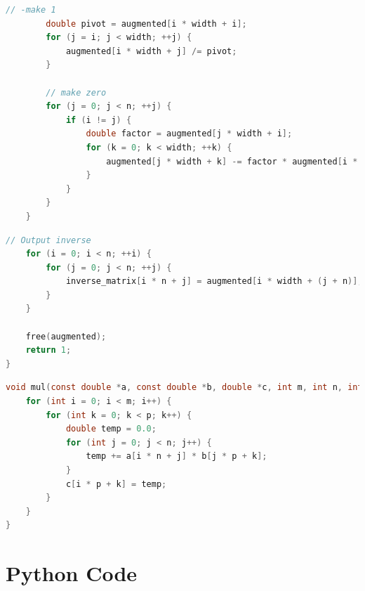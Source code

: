 \documentclass{beamer}
\theoremstyle{remark}
\numberwithin{equation}{section}
\begin{document}
\begin{frame}[fragile]
\begin{lstlisting}[language=C]
        // -make 1
        double pivot = augmented[i * width + i];
        for (j = i; j < width; ++j) {
            augmented[i * width + j] /= pivot;
        }

        // make zero
        for (j = 0; j < n; ++j) {
            if (i != j) {
                double factor = augmented[j * width + i];
                for (k = 0; k < width; ++k) {
                    augmented[j * width + k] -= factor * augmented[i * width + k];
                }
            }
        }
    }
\end{lstlisting}
\end{frame}
\begin{frame}[fragile]
\begin{lstlisting}[language=C]
    // Output inverse
    for (i = 0; i < n; ++i) {
        for (j = 0; j < n; ++j) {
            inverse_matrix[i * n + j] = augmented[i * width + (j + n)];
        }
    }

    free(augmented);
    return 1;
}
\end{lstlisting}
\end{frame}
\begin{frame}[fragile]
\begin{lstlisting}[language=C]
void mul(const double *a, const double *b, double *c, int m, int n, int p) {
    for (int i = 0; i < m; i++) {
        for (int k = 0; k < p; k++) {
            double temp = 0.0;
            for (int j = 0; j < n; j++) {
                temp += a[i * n + j] * b[j * p + k];
            }
            c[i * p + k] = temp;
        }
    }
}

 \end{lstlisting}
\end{frame}

\section{Python Code}
\end{document}
